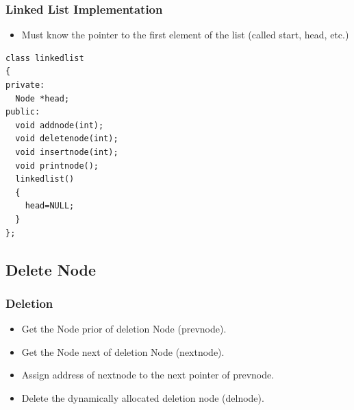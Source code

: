 \documentclass{beamer}
\newtheorem{Key points}{Key points}
\newcommand\Fontviaa{\fontsize{8}{7.2}\selectfont}
\begin{document}
\begin{frame}[fragile]
  \frametitle{Linked List Implementation}
  \begin{itemize}
  \item Must know the pointer to the first element of 
the list (called start, head, etc.)
  \end{itemize}
\Fontviaa
\begin{lstlisting}
class linkedlist
{
private:
  Node *head;
public:
  void addnode(int);
  void deletenode(int);
  void insertnode(int);
  void printnode();
  linkedlist()
  {
    head=NULL;
  }
};
\end{lstlisting}
\end{frame}
\subsection{Delete Node}
\begin{frame}[fragile]
  \frametitle{Deletion}
  \begin{itemize}
  \item Get the Node prior of deletion Node (prevnode).
  \item Get the Node next of deletion Node  (nextnode).
  \item Assign address of nextnode to the next pointer of prevnode. 
  \item Delete the dynamically allocated deletion node (delnode).
  \end{itemize}
\end{frame}

\end{document}
